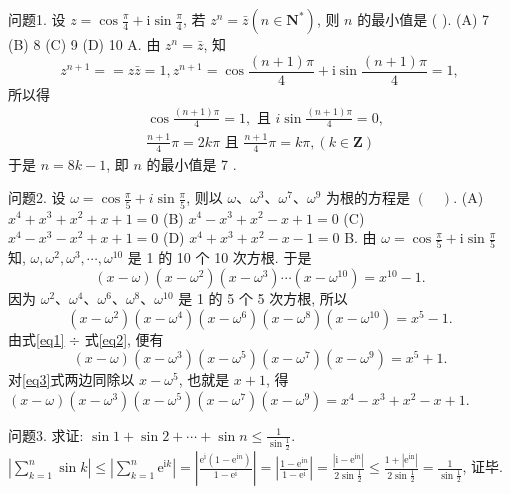 
问题1. 设 $z=\cos \frac{\pi}{4}+\mathrm{i} \sin \frac{\pi}{4}$, 若 $z^n=\bar{z}\left(n \in \mathbf{N}^*\right)$, 则 $n$ 的最小值是 ( ).
(A) 7
(B) 8
(C) 9
(D) 10
A.
由 $z^n=\bar{z}$, 知
$$
z^{n+1}==z \bar{z}=1, z^{n+1}=\cos \frac{(n+1) \pi}{4}+\mathrm{i} \sin \frac{(n+1) \pi}{4}=1,
$$
所以得
$$
\begin{aligned}
& \cos \frac{(n+1) \pi}{4}=1, \text { 且 } i \sin \frac{(n+1) \pi}{4}=0, \\
& \frac{n+1}{4} \pi=2 k \pi \text { 且 } \frac{n+1}{4} \pi=k \pi,(k \in \mathbf{Z})
\end{aligned}
$$
于是 $n=8 k-1$, 即 $n$ 的最小值是 7 .



问题2. 设 $\omega=\cos \frac{\pi}{5}+i \sin \frac{\pi}{5}$, 则以 $\omega 、 \omega^3 、 \omega^7 、 \omega^9$ 为根的方程是 $(\quad)$.
(A) $x^4+x^3+x^2+x+1=0$
(B) $x^4-x^3+x^2-x+1=0$
(C) $x^4-x^3-x^2+x+1=0$
(D) $x^4+x^3+x^2-x-1=0$
B.
由 $\omega=\cos \frac{\pi}{5}+\mathrm{i} \sin \frac{\pi}{5}$ 知, $\omega, \omega^2, \omega^3, \cdots, \omega^{10}$ 是 1 的 10 个 10 次方根.
于是
$$
(x-\omega)\left(x-\omega^2\right)\left(x-\omega^3\right) \cdots\left(x-\omega^{10}\right)=x^{10}-1 . \label{eq1}
$$
因为 $\omega^2 、 \omega^4 、 \omega^6 、 \omega^8 、 \omega^{10}$ 是 1 的 5 个 5 次方根, 所以
$$
\left(x-\omega^2\right)\left(x-\omega^4\right)\left(x-\omega^6\right)\left(x-\omega^8\right)\left(x-\omega^{10}\right)=x^5-1 . \label{eq2}
$$
由式\ref{eq1} $\div$ 式\ref{eq2}, 便有
$$
(x-\omega)\left(x-\omega^3\right)\left(x-\omega^5\right)\left(x-\omega^7\right)\left(x-\omega^9\right)=x^5+1 . \label{eq3}
$$
对\ref{eq3}式两边同除以 $x-\omega^5$, 也就是 $x+1$, 得 $(x-\omega)\left(x-\omega^3\right)\left(x-\omega^5\right)\left(x-\omega^7\right)\left(x-\omega^9\right)=x^4-x^3+x^2-x+1$.



问题3. 求证: $\sin 1+\sin 2+\cdots+\sin n \leqslant \frac{1}{\sin \frac{1}{2}}$.
$\left|\sum_{k=1}^n \sin k\right| \leqslant\left|\sum_{k=1}^n \mathrm{e}^{\mathrm{i} k}\right|=\left|\frac{\mathrm{e}^{\mathrm{i}}\left(1-\mathrm{e}^{\mathrm{i} n}\right)}{1-\mathrm{e}^{\mathrm{i}}}\right|=\left|\frac{1-\mathrm{e}^{\mathrm{i} n}}{1-\mathrm{e}^{\mathrm{i}}}\right|=\frac{\left|\mathrm{i}-\mathrm{e}^{\mathrm{i} n}\right|}{2 \sin \frac{1}{2}} \leqslant \frac{1+\left|\mathrm{e}^{\mathrm{in}}\right|}{2 \sin \frac{1}{2}}=\frac{1}{\sin \frac{1}{2}}$, 证毕.



